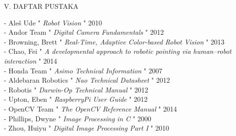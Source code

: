 \documentclass[10pt,journal,compsoc]{IEEEtran}
\begin{document}
  \newpage
  
  \begin{center}
     V. DAFTAR PUSTAKA
  \end{center}
  
  - Aleš Ude " \textit{Robot Vision} " 2010\\
  - Andor Team " \textit{Digital Camera Fundamentals} " 2012\\
  - Browning, Brett " \textit{Real-Time, Adaptive Color-based Robot Vision} " 2013\\
  - Chao, Fei " \textit{A developmental approach to robotic pointing via human–robot interaction} " 2014\\
  - Honda Team " \textit{Asimo Technical Information} " 2007\\
  - Aldebaran Robotics " \textit{Nao Technical Datasheet} " 2012\\
  - Robotis " \textit{Darwin-Op Technical Manual} " 2012\\
  - Upton, Eben " \textit{RaspberryPi User Guide} " 2012\\
  - OpenCV Team " \textit{The OpenCV Reference Manual} " 2014\\
  - Phillips, Dwyne " \textit{Image Processing in C} " 2000\\
  - Zhou, Huiyu " \textit{Digital Image Processing Part I} " 2010\\
\end{document}
